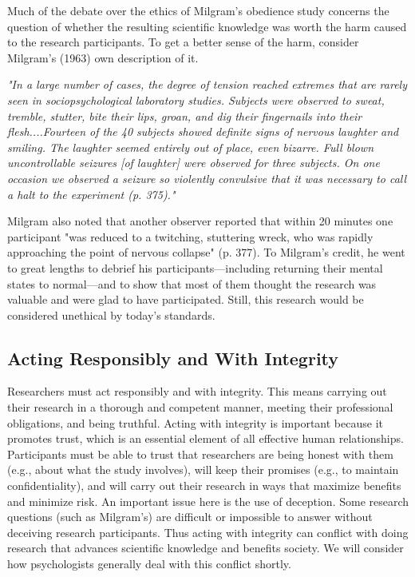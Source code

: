 Much of the debate over the ethics of Milgram's obedience study concerns the question of whether the resulting scientific knowledge was worth the harm caused to the research participants. To get a better sense of the harm, consider Milgram's (1963) own description of it.


\emph{"In a large number of cases, the degree of tension reached extremes that are rarely seen in sociopsychological laboratory studies. Subjects were observed to sweat, tremble, stutter, bite their lips, groan, and dig their fingernails into their flesh....Fourteen of the 40 subjects showed definite signs of nervous laughter and smiling. The laughter seemed entirely out of place, even bizarre. Full blown uncontrollable seizures [of laughter] were observed for three subjects. On one occasion we observed a seizure so violently convulsive that it was necessary to call a halt to the experiment (p. 375)."}


Milgram also noted that another observer reported that within 20 minutes one participant "was reduced to a twitching, stuttering wreck, who was rapidly approaching the point of nervous collapse" (p. 377).
To Milgram's credit, he went to great lengths to debrief his participants---including returning their mental states to normal---and to show that most of them thought the research was valuable and were glad to have participated. Still, this research would be considered unethical by today's standards.


\subsection{Acting Responsibly and With Integrity}

Researchers must act responsibly and with integrity. This means carrying out their research in a thorough and competent manner, meeting their professional obligations, and being truthful. Acting with integrity is important because it promotes trust, which is an essential element of all effective human relationships. Participants must be able to trust that researchers are being honest with them (e.g., about what the study involves), will keep their promises (e.g., to maintain confidentiality), and will carry out their research in ways that maximize benefits and minimize risk. An important issue here is the use of deception. Some research questions (such as Milgram's) are
difficult or impossible to answer without deceiving research participants. Thus acting with integrity can conflict with doing research that advances scientific knowledge and benefits society. We will consider how psychologists generally deal with this conflict shortly.


